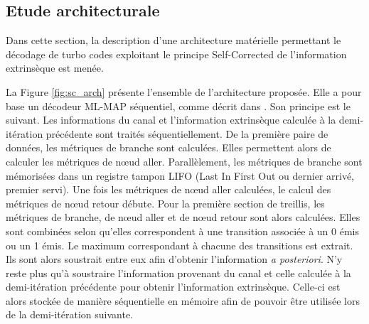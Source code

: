 \subsection{Etude architecturale}
Dans cette section, la description d'une architecture matérielle permettant le décodage de turbo codes exploitant le principe 
Self-Corrected de l'information extrinsèque est menée. 

La Figure \ref{fig:sc_arch} présente l'ensemble de l'architecture proposée. Elle a pour base un décodeur ML-MAP séquentiel, 
comme décrit dans \cite{livre_declercq}. Son principe est le suivant. Les 
informations du canal et l'information extrinsèque calculée à la demi-itération précédente sont traités séquentiellement. De 
la première paire de données, les métriques de branche sont calculées. Elles permettent alors de calculer les métriques 
de nœud aller. Parallèlement, les métriques de branche sont mémorisées dans un registre tampon LIFO (Last In First Out ou 
dernier arrivé, premier servi). Une fois les métriques de nœud aller calculées, le calcul des métriques de nœud retour débute. 
Pour la première section de treillis, les métriques de branche, de nœud aller et de nœud retour sont alors calculées. 
Elles sont combinées selon qu'elles correspondent à une transition associée à un 0 émis ou un 1 émis. Le maximum 
correspondant à chacune des transitions est extrait. Ils sont alors soustrait entre eux afin d'obtenir l'information \textit{a posteriori}. N'y reste plus qu'à soustraire l'information provenant du canal et celle calculée à la demi-itération 
précédente pour obtenir l'information extrinsèque. Celle-ci est alors stockée de manière séquentielle en mémoire afin 
de pouvoir être utilisée lors de la demi-itération suivante.

